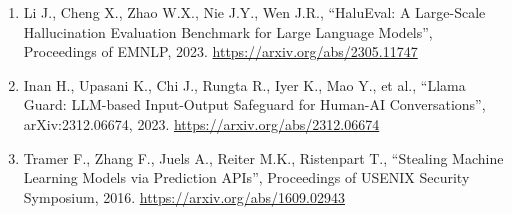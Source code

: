 \documentclass[12pt,a4paper]{article}
\begin{document}
\begin{enumerate}[leftmargin=*, label=\arabic*.]
\item Li J., Cheng X., Zhao W.X., Nie J.Y., Wen J.R., ``HaluEval: A
      Large-Scale Hallucination Evaluation Benchmark for Large Language
      Models'', Proceedings of EMNLP, 2023.
      \url{https://arxiv.org/abs/2305.11747}

\item Inan H., Upasani K., Chi J., Rungta R., Iyer K., Mao Y., et al.,
      ``Llama Guard: LLM-based Input-Output Safeguard for Human-AI
      Conversations'', arXiv:2312.06674, 2023.
      \url{https://arxiv.org/abs/2312.06674}

\item Tramer F., Zhang F., Juels A., Reiter M.K., Ristenpart T.,
      ``Stealing Machine Learning Models via Prediction APIs'',
      Proceedings of USENIX Security Symposium, 2016.
      \url{https://arxiv.org/abs/1609.02943}

\end{enumerate}
\end{document}
